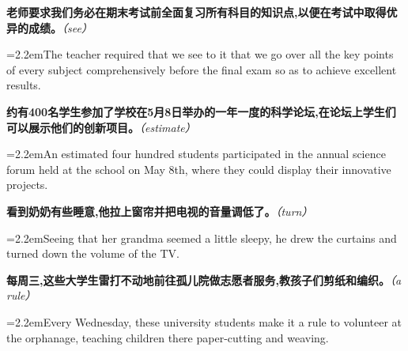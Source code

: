 \documentclass[11pt,a4paper]{article}
\newcommand{\num}[1]{\makebox[1.9em][r]{#1.}\hspace{0.3em}}
\newcommand{\prompt}[1]{\emph{\textcolor{tipblue}{\small（#1）}}}
\begin{document}
\begin{minipage}{\linewidth}

\num{11}\textbf{老师要求我们务必在期末考试前全面复习所有科目的知识点,以便在考试中取得优异的成绩。}\prompt{see}

\vspace{0.15em}

\noindent\hangindent=2.2em\hspace{2.2em}The teacher required that we see to it that we go over all the key points of every subject comprehensively before the final exam so as to achieve excellent results.

\end{minipage}

\begin{minipage}{\linewidth}

\num{12}\textbf{约有400名学生参加了学校在5月8日举办的一年一度的科学论坛,在论坛上学生们可以展示他们的创新项目。}\prompt{estimate}

\vspace{0.15em}

\noindent\hangindent=2.2em\hspace{2.2em}An estimated four hundred students participated in the annual science forum held at the school on May 8th, where they could display their innovative projects.

\end{minipage}

\vspace{0.35em}\vspace{0.15em}

\begin{minipage}{\linewidth}

\num{13}\textbf{看到奶奶有些睡意,他拉上窗帘并把电视的音量调低了。}\prompt{turn}

\vspace{0.15em}

\noindent\hangindent=2.2em\hspace{2.2em}Seeing that her grandma seemed a little sleepy, he drew the curtains and turned down the volume of the TV.

\end{minipage}

\begin{minipage}{\linewidth}

\num{14}\textbf{每周三,这些大学生雷打不动地前往孤儿院做志愿者服务,教孩子们剪纸和编织。}\prompt{a rule}

\vspace{0.15em}

\noindent\hangindent=2.2em\hspace{2.2em}Every Wednesday, these university students make it a rule to volunteer at the orphanage, teaching children there paper-cutting and weaving.

\end{minipage}
\end{document}
